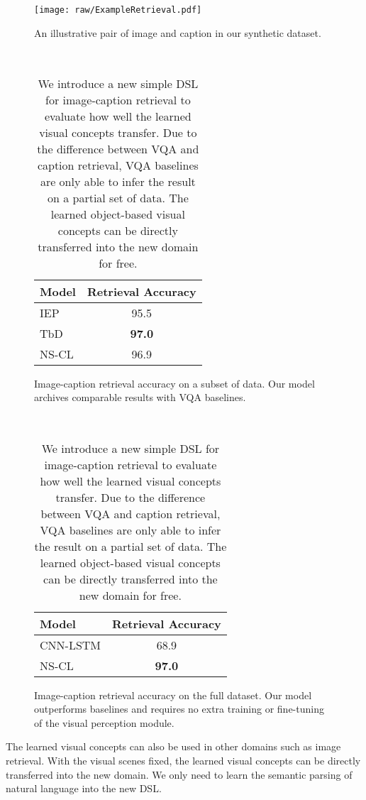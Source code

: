 \documentclass{article} \usepackage{iclr2019_conference,times}
\newcommand{\model}{NS-CL\xspace}
\begin{document}
\begin{table}[t]
\centering\vspace{2pt}
    \begin{subfigure}[*]{0.25\textwidth}
    \texttt{[image: raw/ExampleRetrieval.pdf]}
    \caption{An illustrative pair of image and caption in our synthetic dataset.}
    \end{subfigure}
    ~
    \begin{subfigure}[*]{0.33\textwidth}
        \centering\small
        \begin{tabular}{lc}
        \toprule
        Model & Retrieval Accuracy \\ \midrule
        IEP & 95.5 \\
        TbD & \textbf{97.0} \\
        \model & 96.9 \\ \bottomrule
        \end{tabular}
        \caption{Image-caption retrieval accuracy on a subset of data.  Our model archives comparable results with VQA baselines.}
        \label{tab:expr:retrieval:a}
    \end{subfigure}~ 
    \begin{subfigure}[*]{0.33\textwidth}
        \centering\small
        \begin{tabular}{lc}
        \toprule
        Model & Retrieval Accuracy \\ \midrule
        CNN-LSTM & 68.9 \\
        \model & \textbf{97.0} \\ \bottomrule
        \end{tabular}
        \caption{Image-caption retrieval accuracy on the full dataset. Our model outperforms  baselines and requires no extra training or fine-tuning of the visual perception module.}
        \label{tab:expr:retrieval:b}
    \end{subfigure}
    \caption{We introduce a new simple DSL for image-caption retrieval to evaluate how well the learned visual concepts transfer. Due to the difference between VQA and caption retrieval, VQA baselines are only able to infer the result on a partial set of data. The learned object-based visual concepts can be directly transferred into the new domain for free.}
    \label{tab:expr:retrieval}
    \vspace{-5pt}
\end{table}
 The learned visual concepts can also be used in other domains such as image retrieval. With the visual scenes fixed, the learned visual concepts can be directly transferred into the new domain. We only need to learn the semantic parsing of natural language into the new DSL.
\end{document}
